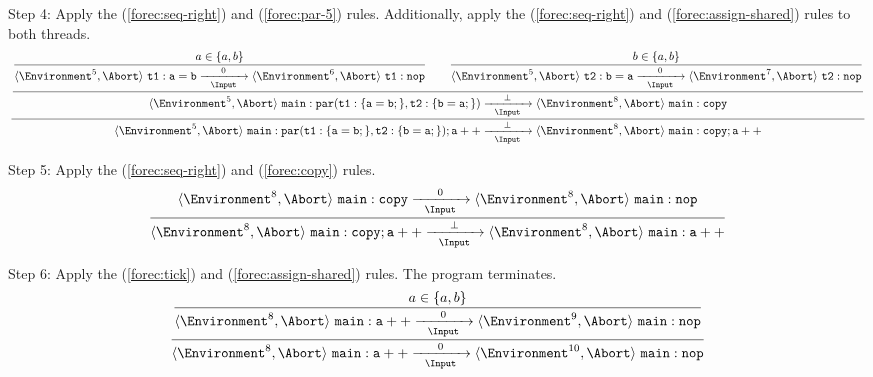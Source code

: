 \noindent
Step 4: Apply the (\ref{forec:seq-right}) and (\ref{forec:par-5}) rules. 
Additionally, apply the (\ref{forec:seq-right}) and (\ref{forec:assign-shared}) rules
to both threads.
\begin{equation*}
	\frac{
		\dfrac{
			\dfrac{
					a \in \lbrace a, b \rbrace
				}{
					\langle \Environment^5, \Abort \rangle ~ \mathtt{t1: a=b}
						\xrightarrow[~~\Input~~]{0} 
					\langle \Environment^6, \Abort \rangle ~ \mathtt{t1: nop}
				}
				\qquad
			\dfrac{
					b \in \lbrace a, b \rbrace
				}{
					\langle \Environment^5, \Abort \rangle ~ \mathtt{t2: b=a}
						\xrightarrow[~~\Input~~]{0} 
					\langle \Environment^7, \Abort \rangle ~ \mathtt{t2: nop}
				}
			}{
				\langle \Environment^5, \Abort \rangle ~ \mathtt{main: par(t1:\{a=b;\},t2:\{b=a;\})}
					\xrightarrow[~~\Input~~]{\bot} 
				\langle \Environment^8, \Abort \rangle ~ \mathtt{main: copy}
			}
		}{
			\langle \Environment^5, \Abort \rangle ~ \mathtt{main: par(t1:\{a=b;\},t2:\{b=a;\}); a++}
				\xrightarrow[~~\Input~~]{\bot} 
			\langle \Environment^8, \Abort \rangle ~ \mathtt{main: copy; a++}
		}
\end{equation*}

\noindent
Step 5: Apply the (\ref{forec:seq-right}) and (\ref{forec:copy}) rules. 
\begin{equation*}
	\frac{
			\langle \Environment^8, \Abort \rangle ~ \mathtt{main: copy}
				\xrightarrow[~~\Input~~]{0} 
			\langle \Environment^8, \Abort \rangle ~ \mathtt{main: nop}
		}{
			\langle \Environment^8, \Abort \rangle ~ \mathtt{main: copy; a++}
				\xrightarrow[~~\Input~~]{\bot} 
			\langle \Environment^8, \Abort \rangle ~ \mathtt{main: a++}
		}
\end{equation*}

\noindent
Step 6: Apply the (\ref{forec:tick}) and (\ref{forec:assign-shared}) rules. 
The program terminates.
\begin{equation*}
	\frac{
		\dfrac{
				a \in \lbrace a, b \rbrace
			}{
				\langle \Environment^8, \Abort \rangle ~ \mathtt{main: a++}
					\xrightarrow[~~\Input~~]{0} 
				\langle \Environment^9, \Abort \rangle ~ \mathtt{main: nop}
			}
		}{
			\langle \Environment^8, \Abort \rangle ~ \mathtt{main: a++}
				\xrightarrow[~~\Input~~]{0} 
			\langle \Environment^{10}, \Abort \rangle ~ \mathtt{main: nop}
		}
\end{equation*}
